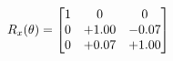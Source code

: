 \documentclass[preview]{standalone}
\begin{document}
\begin{align*}
\special{dvisvgm:raw <g id='unique000'>}R_{x}(\theta) = \begin{bmatrix}1 & 0 & 0 \\0 & +1.00 & -0.07 \\0 & +0.07 & +1.00\end{bmatrix}\special{dvisvgm:raw </g>}
\end{align*}
\end{document}
